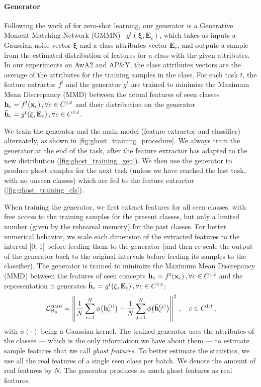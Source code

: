 \paragraph{Generator} Following the work of \cite{bucher2017zeroshot_gmmn} for zero-shot
learning, our generator is a Generative Moment Matching Network (GMMN)~\cite{li2015gmmn}
$g^t(\mathbf{\xi}, \mathbf{E}_c)$, which takes as inputs a Gaussian noise vector $\mathbf{\xi}$ and
a class attributes vector $\mathbf{E}_c$, and outputs a sample from the estimated distribution of
features for a class with the given attributes. In our experiments on AwA2 and AP\&Y, the class
attributes vectors are the average of the attributes for the training samples in the class. For each
task $t$, the feature extractor $f^t$ and the generator $g^t$ are trained to minimize the Maximum
Mean Discrepancy (MMD) \citep{gretton2007twosampleMMD,gretton2012twosampletestMMD} between the
actual features of seen classes $\mathbf{h}_c = f^t(\mathbf{x}_c) \, , \forall c \in C^{1:t}$ and their
distribution on the generator $\tilde{\mathbf{h}}_c = g^t(\mathbf{\xi}, \mathbf{E}_{c}) \,, \forall c \in
    C^{1:t}$.

We train the generator and the main model (feature extractor and classifier) alternately, as shown
in \autoref{fig:ghost_training_procedure}. We always train the generator at the end of the task,
after the feature extractor has adapted to the new distribution (\autoref{fig:ghost_training_gen}).
We then use the generator to produce ghost samples for the next task (unless we have reached the
last task, with no unseen classes) which are fed to the feature extractor
(\autoref{fig:ghost_training_cls}).

When training the generator, we first extract features for all seen classes, with free access to the
training samples for the present classes, but only a limited number (given by the rehearsal memory)
for the past classes. For better numerical behavior, we scale each dimension of the extracted
features to the interval [0, 1] before feeding them to the generator (and then re-scale the output
of the generator back to the original intervals before feeding its samples to the classifier). The
generator is trained to minimize the Maximum Mean Discrepancy (MMD) between the features of seen
concepts $\mathbf{h}_c = f^t(\mathbf{x}_c) \, , \forall c \in C^{1:t}$ and the representation it generates
$\tilde{\mathbf{h}}_c = g^t(\mathbf{\xi}, \mathbf{E}_{c}) \,, \forall c \in C^{1:t}$:
%
\begin{equation}
    \mathcal{L}^\text{\tiny{MMD}}_{\Theta_g} = \left\Vert \frac{1}{N} \sum_{i=1}^N \phi\big(\mathbf{h}^{(i)}_c\big) - \frac{1}{N} \sum_{j=1}^N \phi\big(\tilde{\mathbf{h}}^{(j)}_c\big) \right\Vert^2\,, \quad c \in C^{1:t}\,,
    \label{eq:mmd_loss}
\end{equation}
%
with $\phi(\cdot)$ being a Gaussian kernel. The trained generator uses the attributes of the classes
— which is the only information we have about them — to estimate sample features that we call
\textit{ghost features}. To better estimate the statistics, we use all the real features of a single
seen class per batch. We denote the amount of real features by $N$. The generator produces as much
ghost features as real features.

